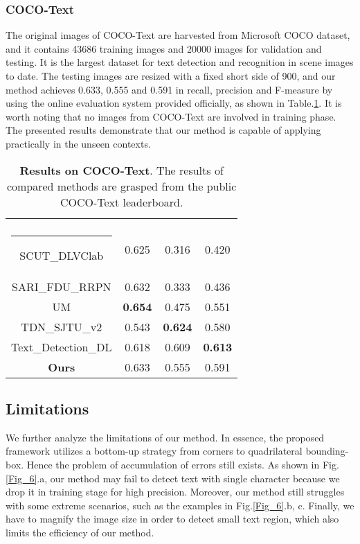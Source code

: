\documentclass[3p, times]{elsarticle}
\makeatletter
\newcommand{\thickhline}{\noalign {\ifnum 0=`}\fi \hrule height 1pt
    \futurelet \reserved@a \@xhline
}
\newcommand{\topcaption}{\setlength{\abovecaptionskip}{0pt}\setlength{\belowcaptionskip}{8pt}\caption}
\makeatother
\begin{document}
\subsubsection{COCO-Text}

The original images of COCO-Text \cite{COCO2016ARXIV} are harvested from Microsoft COCO \cite{MSCOCO2014ECCV} dataset, and it contains 43686 training images and 20000 images for validation and testing. It is the largest dataset for text detection and recognition in scene images to date. The testing images are resized with a fixed short side of 900, and our method achieves 0.633, 0.555 and 0.591 in recall, precision and F-measure by using the online evaluation system provided officially, as shown in Table.\ref{Table_4}. It is worth noting that no images from COCO-Text are involved in training phase. The presented results demonstrate that our method is capable of applying practically in the unseen contexts. 

\setlength{\tabcolsep}{14pt}
\begin{table}[!htb]
\centering
\topcaption{\textbf{Results on COCO-Text}. The results of compared methods are grasped from the public COCO-Text leaderboard.}
\label{Table_4}
\begin{tabular}{|c|c|c|c|}
    \hline
                &     &  &  \\\thickhline
    SCUT\_DLVClab       & 0.625       & 0.316       & 0.420       \\\hline
    SARI\_FDU\_RRPN     & 0.632       & 0.333       & 0.436       \\\hline
    UM                  & {\bf 0.654} & 0.475       & 0.551       \\\hline
    TDN\_SJTU\_v2       & 0.543       & {\bf 0.624} & 0.580       \\\hline
    Text\_Detection\_DL & 0.618       & 0.609       & {\bf 0.613} \\\hline
    \textbf{Ours}       & 0.633       & 0.555       & 0.591       \\\hline
\end{tabular}
\end{table}
\setlength{\tabcolsep}{1.4pt}



\subsection{Limitations}
We further analyze the limitations of our method. In essence, the proposed framework utilizes a bottom-up strategy from corners to quadrilateral bounding-box. Hence the problem of accumulation of errors still exists. As shown in Fig.\ref{Fig_6}.a, our method may fail to detect text with single character because we drop it in training stage for high precision. Moreover, our method still struggles with some extreme scenarios, such as the examples in Fig.\ref{Fig_6}.b, c. Finally, we have to magnify the image size in order to detect small text region, which also limits the efficiency of our method. 
\end{document}
